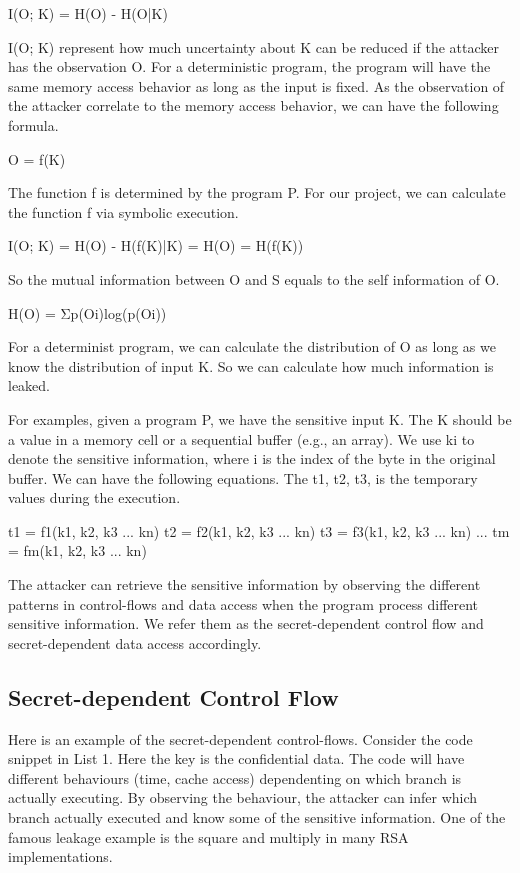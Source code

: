 I(O; K) = H(O) - H(O|K)

I(O; K) represent how much uncertainty about K can be reduced if the attacker has the observation O.
For a deterministic program, the program will have the same memory access behavior as long as the input is fixed. 
As the observation of the attacker correlate to the memory access behavior, 
we can have the following formula.

O = f(K)

The function f is determined by the program P. For our project, we can calculate the function f via symbolic execution.

I(O; K) = H(O) - H(f(K)|K) = H(O) = H(f(K))

So the mutual information between O and S equals to the self information of O. 

H(O) = Σp(Oi)log(p(Oi))

For a determinist program, we can calculate the distribution of O as long as we know the distribution of input K. So we can calculate how much information is leaked.

For examples, given a program P, we have the sensitive input K. The K should be a value in a memory cell or a sequential buffer (e.g., an array). We use ki to denote the sensitive information, where i is the index of the byte in the original buffer.  We can have the following equations. The t1, t2, t3, is the temporary values during the execution.

t1 = f1(k1, k2, k3 ... kn)
t2 = f2(k1, k2, k3 ... kn)
t3 = f3(k1, k2, k3 ... kn)
...
tm = fm(k1, k2, k3 ... kn)

The attacker can retrieve the sensitive information by observing the different patterns in control-flows and data access when the program process different sensitive information. We refer them as the secret-dependent control flow and secret-dependent data access accordingly.

\subsection{Secret-dependent Control Flow}
Here is an example of the secret-dependent control-flows. Consider the code snippet in List 1. Here the key is the confidential data. The code will have different behaviours (time, cache access) dependenting on which branch is actually executing. By observing the behaviour, the attacker can infer which branch actually executed and know some of the sensitive information. One of the famous leakage example is the square and multiply in many RSA implementations. 

